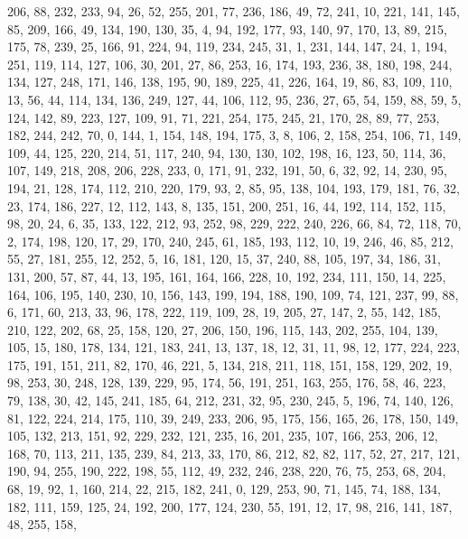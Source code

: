 \begin{DoxyCode}
       206, 88, 232, 233, 94, 26, 52, 255, 201, 77, 236, 186, 49, 72, 241, 10, 221, 141, 145, 85, 209, 166, 49,
       134, 190, 130, 35, 4, 94, 192, 177, 93, 140, 97, 170, 13, 89, 215, 175, 78, 239, 25, 166, 91, 224, 94, 119,
       234, 245, 31, 1, 231, 144, 147, 24, 1, 194, 251, 119, 114, 127, 106, 30, 201, 27, 86, 253, 16, 174, 193, 236,
       38, 180, 198, 244, 134, 127, 248, 171, 146, 138, 195, 90, 189, 225, 41, 226, 164, 19, 86, 83, 109, 110, 13,
       56, 44, 114, 134, 136, 249, 127, 44, 106, 112, 95, 236, 27, 65, 54, 159, 88, 59, 5, 124, 142, 89, 223, 127,
       109, 91, 71, 221, 254, 175, 245, 21, 170, 28, 89, 77, 253, 182, 244, 242, 70, 0, 144, 1, 154, 148, 194, 175,
       3, 8, 106, 2, 158, 254, 106, 71, 149, 109, 44, 125, 220, 214, 51, 117, 240, 94, 130, 130, 102, 198, 16,
       123, 50, 114, 36, 107, 149, 218, 208, 206, 228, 233, 0, 171, 91, 232, 191, 50, 6, 32, 92, 14, 230, 95, 194, 21,
       128, 174, 112, 210, 220, 179, 93, 2, 85, 95, 138, 104, 193, 179, 181, 76, 32, 23, 174, 186, 227, 12, 112,
       143, 8, 135, 151, 200, 251, 16, 44, 192, 114, 152, 115, 98, 20, 24, 6, 35, 133, 122, 212, 93, 252, 98, 229,
       222, 240, 226, 66, 84, 72, 118, 70, 2, 174, 198, 120, 17, 29, 170, 240, 245, 61, 185, 193, 112, 10, 19, 246,
       46, 85, 212, 55, 27, 181, 255, 12, 252, 5, 16, 181, 120, 15, 37, 240, 88, 105, 197, 34, 186, 31, 131, 200,
       57, 87, 44, 13, 195, 161, 164, 166, 228, 10, 192, 234, 111, 150, 14, 225, 164, 106, 195, 140, 230, 10, 156,
       143, 199, 194, 188, 190, 109, 74, 121, 237, 99, 88, 6, 171, 60, 213, 33, 96, 178, 222, 119, 109, 28, 19, 205,
       27, 147, 2, 55, 142, 185, 210, 122, 202, 68, 25, 158, 120, 27, 206, 150, 196, 115, 143, 202, 255, 104, 139,
       105, 15, 180, 178, 134, 121, 183, 241, 13, 137, 18, 12, 31, 11, 98, 12, 177, 224, 223, 175, 191, 151, 211,
       82, 170, 46, 221, 5, 134, 218, 211, 118, 151, 158, 129, 202, 19, 98, 253, 30, 248, 128, 139, 229, 95, 174,
       56, 191, 251, 163, 255, 176, 58, 46, 223, 79, 138, 30, 42, 145, 241, 185, 64, 212, 231, 32, 95, 230, 245, 5,
       196, 74, 140, 126, 81, 122, 224, 214, 175, 110, 39, 249, 233, 206, 95, 175, 156, 165, 26, 178, 150, 149,
       105, 132, 213, 151, 92, 229, 232, 121, 235, 16, 201, 235, 107, 166, 253, 206, 12, 168, 70, 113, 211, 135, 239,
       84, 213, 33, 170, 86, 212, 82, 82, 117, 52, 27, 217, 121, 190, 94, 255, 190, 222, 198, 55, 112, 49, 232,
       246, 238, 220, 76, 75, 253, 68, 204, 68, 19, 92, 1, 160, 214, 22, 215, 182, 241, 0, 129, 253, 90, 71, 145, 74,
       188, 134, 182, 111, 159, 125, 24, 192, 200, 177, 124, 230, 55, 191, 12, 17, 98, 216, 141, 187, 48, 255, 158,

\end{DoxyCode}
